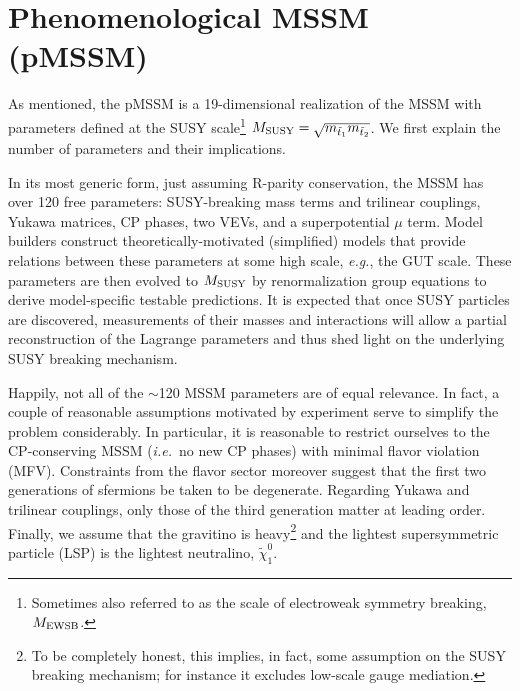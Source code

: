 \section{Phenomenological MSSM (pMSSM)}
\label{sec:model}

As mentioned, the pMSSM is a 19-dimensional realization of the MSSM 
with parameters defined at the SUSY scale\footnote{Sometimes 
also referred to as the scale of electroweak symmetry breaking, $M_{\rm EWSB}$.} 
$M_{\rm SUSY}=\sqrt{m_{\tilde t_1}m_{\tilde t_2}}$. We first explain
the number of parameters and their implications.

In its most generic form, just assuming R-parity conservation, 
the MSSM has over 120 free parameters: 
SUSY-breaking mass terms and trilinear couplings, Yukawa matrices, 
CP phases, two VEVs, and a superpotential $\mu$ term. 
Model builders construct theoretically-motivated (simplified) models 
that provide relations between these parameters at some high scale, 
{\it e.g.}, the GUT scale. 
These parameters are 
then evolved to $M_{\rm SUSY}$ by renormalization group equations 
to derive model-specific testable predictions. It is expected that once SUSY 
particles are discovered, measurements 
of their masses and interactions will allow a partial reconstruction 
of the Lagrange parameters and thus shed light on the underlying SUSY 
breaking mechanism.
 
Happily, not all of the $\sim$120 MSSM parameters are of equal relevance.
In fact, a couple of reasonable assumptions motivated by experiment serve to 
simplify the problem considerably. In particular, it is reasonable to restrict ourselves 
to the CP-conserving MSSM ({\it i.e.}\ no new CP phases) with minimal flavor violation (MFV).  
Constraints from the flavor sector moreover suggest that the first two generations 
of sfermions be taken to be degenerate. Regarding Yukawa and trilinear couplings, 
only those of the third generation matter at leading order. 
Finally, we assume that the gravitino is heavy\footnote{To be completely honest, 
this implies, in fact, some assumption on the SUSY breaking mechanism; for instance it 
excludes low-scale gauge mediation.} and the lightest supersymmetric 
particle (LSP) is the lightest neutralino, $\tilde\chi^0_1$.
 
